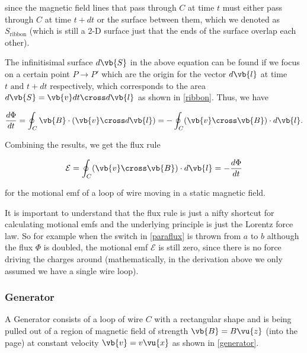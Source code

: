 \documentclass[english,a4paper,12pt]{report}
\begin{document}
since the magnetic field lines that pass through \(C\) at time \(t\) must either pass through \(C\) at time \(t+dt\) or the surface between them, which we denoted as \(S _{\text{ribbon} } \) (which is still a 2-D surface just that the ends of the surface overlap each other). 

The infinitisimal surface \(d \vb{S} \) in the above equation can be found if we focus on a certain point \(P \rightarrow P'\) which are the origin for the vector \(d \vb{l} \) at time \(t \text { and }  t+dt\) respectively, which corresponds to the area \(d\vb{S} = \vb{v} dt \cross d\vb{l} \) as shown in \cref{ribbon}. Thus, we have

\begin{equation}
    \frac{d\Phi }{dt} = \oint_{C} \vb{B} \cdot (\vb{v} \cross d \vb{l} ) = -\oint_{C} (\vb{v} \cross \vb{B} ) \cdot d \vb{l}.    
\end{equation}

Combining the results, we get the flux rule

\begin{equation} \label{motionalemf} 
    \mathcal{E} = \oint_{C} (\vb{v} \cross \vb{B} )\cdot d \vb{l} = -\frac{d\Phi }{dt}
\end{equation}

for the motional emf of a loop of wire moving in a static magnetic field.

It is important to understand that the flux rule is just a nifty shortcut for calculating motional emfs and the underlying principle is just the Lorentz force law. So for example when the switch in \cref{paraflux} is thrown from \(a\) to \(b\) although the flux \(\Phi \) is doubled, the motional emf \(\mathcal{E}\) is still zero, since there is no force driving the charges around (mathematically, in the derivation above we only assumed we have a single wire loop).


\subsubsection{Generator}

A Generator consists of a loop of wire \(C\) with a rectangular shape and is being pulled out of a region of magnetic field of strength \(\vb{B} = B \vu{z}  \) (into the page) at constant velocity \(\vb{v} = v \vu{x} \)  as shown in \cref{generator}.

\end{document}
